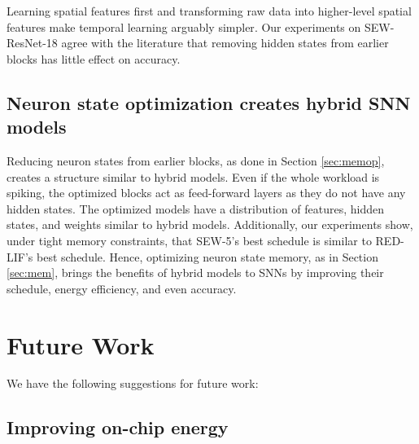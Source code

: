 Learning spatial features first and transforming raw data into higher-level spatial features make temporal learning arguably simpler\cite{red}. Our experiments on SEW-ResNet-18 agree with the literature that removing hidden states from earlier blocks has little effect on accuracy\cite{10204090}.


\subsection*{Neuron state optimization creates hybrid SNN models}
Reducing neuron states from earlier blocks, as done in Section \ref{sec:memop}, creates a structure similar to hybrid models. Even if the whole workload is spiking, the optimized blocks act as feed-forward layers as they do not have any hidden states. The optimized models have a distribution of features, hidden states, and weights similar to hybrid models. Additionally, our experiments show, under tight memory constraints, that SEW-5's best schedule is similar to RED-LIF's best schedule. Hence, optimizing neuron state memory, as in Section \ref{sec:mem}, brings the benefits of hybrid models to SNNs by improving their schedule, energy efficiency, and even accuracy. 

\section{Future Work}

We have the following suggestions for future work:




\subsection*{Improving on-chip energy}

